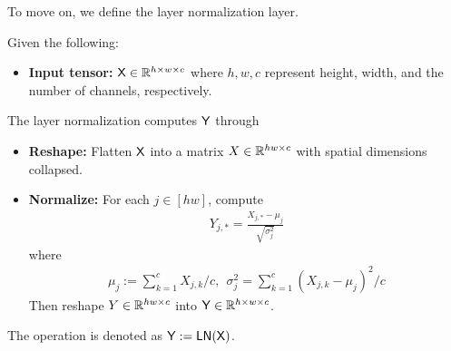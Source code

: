 To move on, we define the layer normalization layer.
\begin{definition}\label{def:ln}
    Given the following:
    \begin{itemize}
        \item {\bf Input tensor:} $\mathsf{X} \in \mathbb{R}^{h \times w \times c}$ where $h,w,c$ represent height, width, and the number of channels, respectively.
    \end{itemize}
    The layer normalization computes $\mathsf{Y}$ through
    \begin{itemize}
        \item {\bf Reshape:} Flatten $\mathsf{X}$ into a matrix $X \in \mathbb{R}^{hw \times c}$ with spatial dimensions collapsed.
        \item {\bf Normalize:} For each $j \in [hw]$, compute
        \begin{align*}
            Y_{j,*} =  \frac{X_{j,*}-\mu_j}{\sqrt{\sigma_j^2}}
        \end{align*}
        where
        \begin{align*}
            \mu_j := \sum_{k=1}^c X_{j,k}/c, ~~ \sigma_{j}^2 = \sum_{k=1}^c(X_{j,k}-\mu_j)^2/c
        \end{align*}
        Then reshape $Y \in \mathbb{R}^{hw \times c}$ into $\mathsf{Y} \in \mathbb{R}^{h \times w \times c}$.
    \end{itemize}
    The operation is denoted as $\mathsf{Y} := \mathsf{LN}(\mathsf{X})$.
\end{definition}


